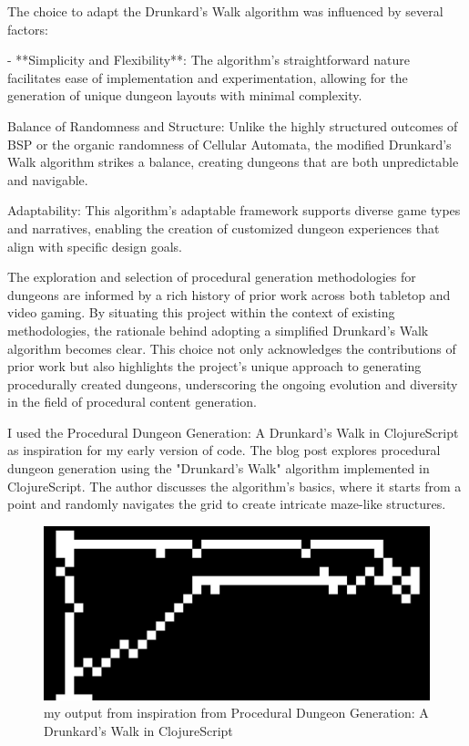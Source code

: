 \documentclass[10pt,twocolumn]{article}
\begin{document}
The choice to adapt the Drunkard’s Walk algorithm was influenced by several factors:

- **Simplicity and Flexibility**: The algorithm’s straightforward nature facilitates ease of implementation and experimentation, allowing for the generation of unique dungeon layouts with minimal complexity.

Balance of Randomness and Structure: Unlike the highly structured outcomes of BSP or the organic randomness of Cellular Automata, the modified Drunkard’s Walk algorithm strikes a balance, creating dungeons that are both unpredictable and navigable.

Adaptability: This algorithm's adaptable framework supports diverse game types and narratives, enabling the creation of customized dungeon experiences that align with specific design goals.

The exploration and selection of procedural generation methodologies for dungeons are informed by a rich history of prior work across both tabletop and video gaming. By situating this project within the context of existing methodologies, the rationale behind adopting a simplified Drunkard’s Walk algorithm becomes clear. This choice not only acknowledges the contributions of prior work but also highlights the project's unique approach to generating procedurally created dungeons, underscoring the ongoing evolution and diversity in the field of procedural content generation.

I used the Procedural Dungeon Generation: A Drunkard's Walk in ClojureScript as inspiration for my early version of code. The blog post explores procedural dungeon generation using the "Drunkard's Walk" algorithm implemented in ClojureScript. The author discusses the algorithm's basics, where it starts from a point and randomly navigates the grid to create intricate maze-like structures. \cite{jrheard_dungeon_clojurescript}

\begin{figure}
    \centering
    \includegraphics[width=0.5\linewidth]{mine.png}
    \caption{my output from inspiration from Procedural Dungeon Generation: A Drunkard's Walk in ClojureScript}
    \label{fig:enter-label}
\end{figure}
\end{document}
